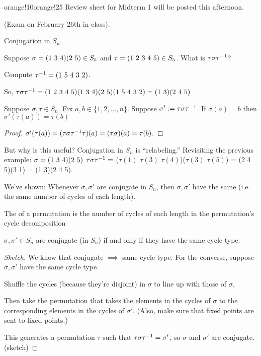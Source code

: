 \documentclass[notes.tex]{subfiles}
\begin{document}
\begin{classnote}{orange!10}{orange!25}
	Review sheet for Midterm 1 will be posted this afternoon.

	(Exam on February 26th in class).
\end{classnote}

Conjugation in $S_n$.

\begin{eg}
	Suppose $\sigma = \text{(1 3 4)}\text{(2 5)}\in S_5$ and $\tau=\text{(1 2 3 4 5)}\in S_5$.
	What is $\tau\sigma{\tau}^{-1}$?

	Compute ${\tau}^{-1}=\text{(1 5 4 3 2)}$.

	So, $\tau\sigma{\tau}^{-1} = \text{(1 2 3 4 5)}\text{(1 3 4)}\text{(2 5)}\text{(1 5 4 3 2)} = \text{(1 3)}\text{(2 4 5)}$
\end{eg}

\begin{proposition}
	Suppose $\sigma, \tau \in S_n$.
	Fix $a, b\in \{1,2,\ldots, n\}$.
	Suppose $\sigma' := \tau\sigma{\tau}^{-1}$.
	If $\sigma(a) = b$ then $\sigma'(\tau(a)) = \tau(b)$
\end{proposition}
\begin{proof}
	$\sigma'(\tau(a)) = (\tau\sigma{\tau}^{-1}\tau)(a) = (\tau\sigma)(a) = \tau(b)$.
\end{proof}
But why is this useful?
Conjugation in $S_n$ is ``relabeling.''
Revisiting the previous example:
$\sigma = \text{(1 3 4)}\text{(2 5)}$
$\tau\sigma{\tau}^{-1} = $ ($\tau(1)$ $\tau(3)$ $\tau(4)$)($\tau(3)$ $\tau(5)$) = (2 4 5)(3 1) = (1 3)(2 4 5).

We've shown: Whenever $\sigma, \sigma'$ are conjugate in $S_n$, then $\sigma, \sigma'$ have the same  (i.e. the same number of cycles of each length).

\begin{defn}
	The  of a permutation is the number of cycles of each length in the permutation's cycle decomposition
\end{defn}

\begin{theorem}
	$\sigma, \sigma'\in S_n$ are conjugate (in $S_n$) if and only if they have the same cycle type.
\end{theorem}
\begin{proof}[Sketch]
	We know that conjugate $\implies$ same cycle type.
	For the converse, suppose $\sigma, \sigma'$ have the same cycle type.

	Shuffle the cycles (because they're disjoint) in $\sigma$ to line up with those of $\sigma$.

	Then take the permutation that takes the elements in the cycles of $\sigma$ to the corresponding elements in the cycles of $\sigma'$. (Also, make sure that fixed points are sent to fixed points.)

	This generates a permutation $\tau$ such that $\tau\sigma{\tau}^{-1} = \sigma'$, so $\sigma$ and $\sigma'$ are conjugate.
	\qedhere(sketch)
\end{proof}
\end{document}
